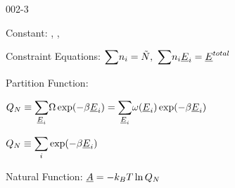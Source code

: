 \begin{mitframe}{002-3} %

    
	\begin{listone}
    
    	\item Constant: \nummoles, \uline{\vol}, \Temp
    
    	\item Constraint Equations: $\mathlarger\sum\nolimits \molspecies{i} = \totmoles, ~\mathlarger\sum\nolimits \molspecies{i}\uline{\energy}_{i} = \uline{\energy}^{total}  $     
    
    	\item Partition Function:
    
    	\begin{listtwo}
    
    		\item $\cpf \equiv \mathlarger\sum\limits_{\uline{\energy}_{i}} \mpc\exp(-\boltznorm\uline{\energy}_{i}) = \mathlarger\sum\limits_{\uline{\energy}_{i}} \mpf(\uline{\energy}_{i})\exp(-\boltznorm\uline{\energy}_{i}) $
    
    		\item $\cpf \equiv \mathlarger\sum\limits_{i} \exp(-\boltznorm\uline{\energy}_{i}) $
           
   	 	\end{listtwo}
           
    	\item Natural Function: $\uline{\helmholtz} = -\boltz\Temp\ln\cpf$	    
    
	\end{listone}
    
\end{mitframe}